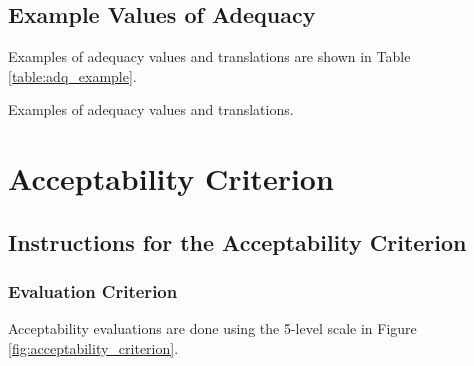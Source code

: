 \documentclass[english]{jnlp_1.4}
\begin{document}
\subsection{Example Values of Adequacy}
\label{sec:apn:adq_example}

Examples of adequacy values and translations are shown in Table \ref{table:adq_example}.

\begin{table}[b]
\caption{Examples of adequacy values and translations.}
\label{table:adq_example}

\end{table}


\section{Acceptability Criterion}

\subsection{Instructions for the Acceptability Criterion}
\label{sec:apn:acceptability}

\subsubsection{Evaluation Criterion}

Acceptability evaluations are done using the 5-level scale in Figure \ref{fig:acceptability_criterion}.
\end{document}
